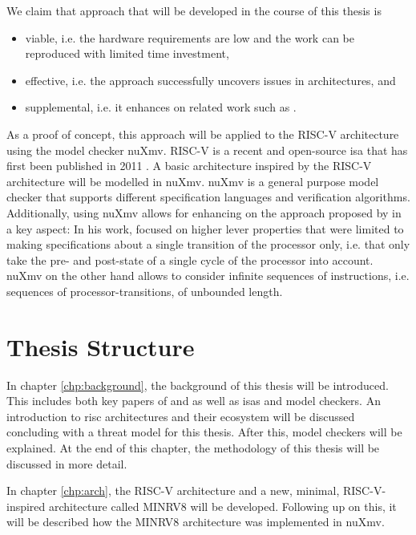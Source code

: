 We claim that approach that will be developed in the course of this thesis is
\begin{itemize}
    \item viable, i.e. the hardware requirements are low and the work can be reproduced with limited time investment,
    \item effective, i.e. the approach successfully uncovers issues in architectures, and
    \item supplemental, i.e. it enhances on related work such as \cite{Reid17}.
\end{itemize}

As a proof of concept, this approach will be applied to the RISC-V architecture using the model checker nuXmv.
RISC-V is a recent and open-source \gls{isa} that has first been published in 2011 \cite{RiscVISA-org}.
A basic architecture inspired by the RISC-V architecture will be modelled in nuXmv.
nuXmv is a general purpose model checker that supports different specification languages and verification algorithms.
Additionally, using nuXmv allows for enhancing on the approach proposed by \citeauthor{Reid17} in a key aspect:
In his work, \citeauthor{Reid17} focused on higher lever properties that were limited to making specifications about a single transition of the processor only, i.e. that only take the pre- and post-state of a single cycle of the processor into account.
nuXmv on the other hand allows to consider infinite sequences of instructions, i.e. sequences of processor-transitions, of unbounded length.

\section{Thesis Structure}

In chapter \ref{chp:background}, the background of this thesis will be introduced.
This includes both key papers of \citeauthor{Reid17} and \citeauthor{Ferraiuolo17} as well as \glspl{isa} and model checkers.
An introduction to \gls{risc} architectures and their ecosystem will be discussed concluding with a threat model for this thesis.
After this, model checkers will be explained.
At the end of this chapter, the methodology of this thesis will be discussed in more detail.

In chapter \ref{chp:arch}, the RISC-V architecture and a new, minimal, RISC-V-inspired architecture called MINRV8 will be developed.
Following up on this, it will be described how the MINRV8 architecture was implemented in nuXmv.


